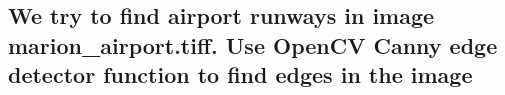 \documentclass{article}
\begin{document}
\subsection{We try to find airport runways in image marion\_airport.tiff. Use OpenCV Canny edge detector function to find edges in the image}


 \quad
{} \quad
\end{document}
